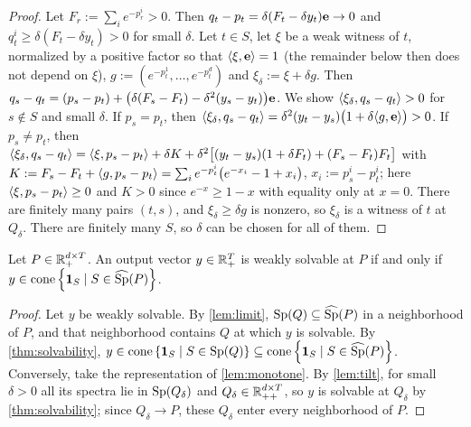 \begin{proof}
Let $F_r:=\sum_ie^{-p^i_r}>0$. Then $q_t-p_t=\delta(F_t-\delta y_t)\e\to0$ and $q^i_t\ge\delta(F_t-\delta y_t)>0$ for small $\delta$. Let $t\in S$, let $\xi$ be a weak witness of $t$, normalized by a positive factor so that $\ip{\xi}{\e}=1$ (the remainder below then does not depend on $\xi$), $g:=(e^{-p^1_t},\dots,e^{-p^d_t})$ and $\xi_\delta:=\xi+\delta g$. Then $q_s-q_t=(p_s-p_t)+\bigl(\delta(F_s-F_t)-\delta^2(y_s-y_t)\bigr)\e$. We show $\ip{\xi_\delta}{q_s-q_t}>0$ for $s\notin S$ and small $\delta$. If $p_s=p_t$, then $\ip{\xi_\delta}{q_s-q_t}=\delta^2(y_t-y_s)\bigl(1+\delta\ip g\e\bigr)>0$. If $p_s\ne p_t$, then $\ip{\xi_\delta}{q_s-q_t}=\ip\xi{p_s-p_t}+\delta K+\delta^2\bigl[(y_t-y_s)(1+\delta F_t)+(F_s-F_t)F_t\bigr]$ with $K:=F_s-F_t+\ip g{p_s-p_t}=\sum_ie^{-p^i_t}\bigl(e^{-x_i}-1+x_i\bigr)$, $x_i:=p^i_s-p^i_t$; here $\ip\xi{p_s-p_t}\ge0$ and $K>0$ since $e^{-x}\ge1-x$ with equality only at $x=0$. There are finitely many pairs $(t,s)$, and $\xi_\delta\ge\delta g$ is nonzero, so $\xi_\delta$ is a witness of $t$ at $Q_\delta$. There are finitely many $S$, so $\delta$ can be chosen for all of them.
\end{proof}

\begin{theorem}\label{thm:closure}
Let $P\in\Rp[d\times T]$. An output vector $y\in\Rp[T]$ is weakly solvable at $P$ if and only if $y\in\cone\set{\ind S\mid S\in\wSp(P)}$.
\end{theorem}

\begin{proof}
Let $y$ be weakly solvable. By \cref{lem:limit}, $\Sp(Q)\subseteq\wSp(P)$ in a neighborhood of $P$, and that neighborhood contains $Q$ at which $y$ is solvable. By \cref{thm:solvability}, $y\in\cone\set{\ind S\mid S\in\Sp(Q)}\subseteq\cone\set{\ind S\mid S\in\wSp(P)}$. Conversely, take the representation of \cref{lem:monotone}. By \cref{lem:tilt}, for small $\delta>0$ all its spectra lie in $\Sp(Q_\delta)$ and $Q_\delta\in\Rpp[d\times T]$, so $y$ is solvable at $Q_\delta$ by \cref{thm:solvability}; since $Q_\delta\to P$, these $Q_\delta$ enter every neighborhood of $P$.
\end{proof}
